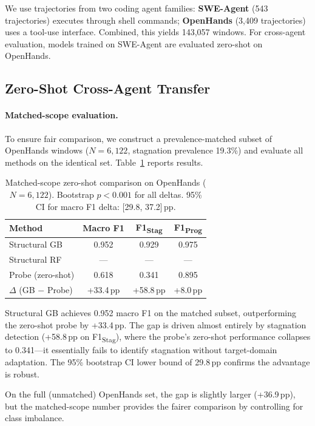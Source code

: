 \documentclass[11pt,a4paper]{article}
\begin{document}
We use trajectories from two coding agent families:
\textbf{SWE-Agent} (543 trajectories) executes through shell commands;
\textbf{OpenHands} (3{,}409 trajectories) uses a tool-use interface.
Combined, this yields 143{,}057 windows.
For cross-agent evaluation, models trained on SWE-Agent are evaluated zero-shot on OpenHands.

\subsection{Zero-Shot Cross-Agent Transfer}
\label{sec:exp-transfer}

\paragraph{Matched-scope evaluation.}
To ensure fair comparison, we construct a prevalence-matched subset of OpenHands windows ($N{=}6{,}122$, stagnation prevalence 19.3\%) and evaluate all methods on the identical set.
Table~\ref{tab:matched} reports results.

\begin{table}[t]
\centering
\small
\begin{tabular}{lccc}
\toprule
\textbf{Method} & \textbf{Macro F1} & \textbf{F1\textsubscript{Stag}} & \textbf{F1\textsubscript{Prog}} \\
\midrule
Structural GB & 0.952 & 0.929 & 0.975 \\
Structural RF & --- & --- & --- \\
Probe (zero-shot) & 0.618 & 0.341 & 0.895 \\
\midrule
$\Delta$ (GB $-$ Probe) & +33.4\,pp & +58.8\,pp & +8.0\,pp \\
\bottomrule
\end{tabular}
\caption{Matched-scope zero-shot comparison on OpenHands ($N{=}6{,}122$). Bootstrap $p < 0.001$ for all deltas. 95\% CI for macro F1 delta: [29.8, 37.2]\,pp.}
\label{tab:matched}
\end{table}

Structural GB achieves 0.952 macro F1 on the matched subset, outperforming the zero-shot probe by +33.4\,pp.
The gap is driven almost entirely by stagnation detection (+58.8\,pp on F1\textsubscript{Stag}), where the probe's zero-shot performance collapses to 0.341---it essentially fails to identify stagnation without target-domain adaptation.
The 95\% bootstrap CI lower bound of 29.8\,pp confirms the advantage is robust.

On the full (unmatched) OpenHands set, the gap is slightly larger (+36.9\,pp), but the matched-scope number provides the fairer comparison by controlling for class imbalance.
\end{document}
